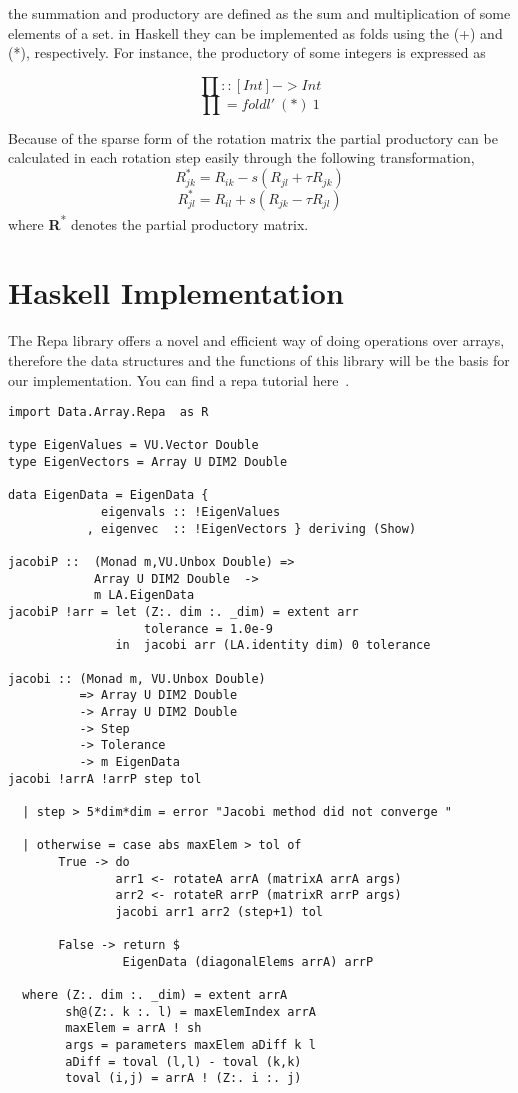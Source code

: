 \documentclass{tmr}
\begin{document}
the summation and productory are defined as the sum and multiplication of some elements of a set.
in Haskell they can be implemented as folds using the (+) and (*), respectively. For instance,
the productory of some integers is expressed as

\[ \prod :: [Int] -> Int \]
\[ \prod  = foldl'\: (*)\: 1 \]


Because of the sparse form of the rotation matrix the partial productory can 
be calculated in each rotation step easily through the following transformation,
\begin{equation}\label{6} R^{*}_{jk} = R_{ik}  -  s (R_{jl} + \tau R_{jk}) \end{equation}
\begin{equation}\label{7} R^{*}_{jl} = R_{il}  +  s (R_{jk} - \tau R_{jl}) \end{equation}
where {\textbf R\textsuperscript{*}} denotes the partial productory matrix.

\section{Haskell Implementation} 
The Repa library offers a novel and efficient
way of doing operations over arrays, therefore the data structures
and the functions of this library will be the basis for our 
implementation. You can find a repa tutorial here~\cite{repa}.

\begin{lstlisting}[float,captionpos=b,belowcaptionskip=4pt, caption= Jacobi Method]
import Data.Array.Repa  as R

type EigenValues = VU.Vector Double
type EigenVectors = Array U DIM2 Double

data EigenData = EigenData {
             eigenvals :: !EigenValues
           , eigenvec  :: !EigenVectors } deriving (Show)

jacobiP ::  (Monad m,VU.Unbox Double) =>
            Array U DIM2 Double  ->
            m LA.EigenData
jacobiP !arr = let (Z:. dim :. _dim) = extent arr
                   tolerance = 1.0e-9
               in  jacobi arr (LA.identity dim) 0 tolerance

jacobi :: (Monad m, VU.Unbox Double)
          => Array U DIM2 Double
          -> Array U DIM2 Double
          -> Step
          -> Tolerance
          -> m EigenData
jacobi !arrA !arrP step tol

  | step > 5*dim*dim = error "Jacobi method did not converge "

  | otherwise = case abs maxElem > tol of
       True -> do
               arr1 <- rotateA arrA (matrixA arrA args)
               arr2 <- rotateR arrP (matrixR arrP args)
               jacobi arr1 arr2 (step+1) tol

       False -> return $
                EigenData (diagonalElems arrA) arrP

  where (Z:. dim :. _dim) = extent arrA
        sh@(Z:. k :. l) = maxElemIndex arrA
        maxElem = arrA ! sh
        args = parameters maxElem aDiff k l
        aDiff = toval (l,l) - toval (k,k)
        toval (i,j) = arrA ! (Z:. i :. j)
\end{lstlisting}
\end{document}
